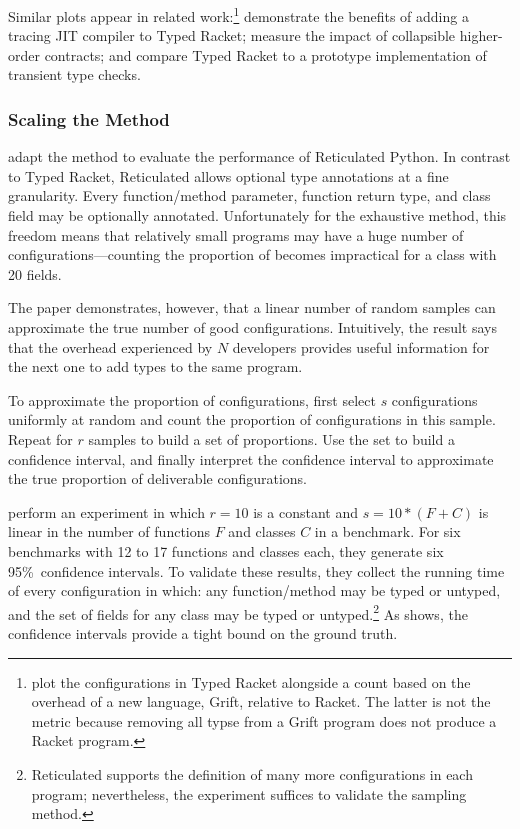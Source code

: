 Similar plots appear in related work:\footnote{\citet{kat-pldi-2019} plot the
  configurations in Typed Racket alongside a count based on
 the overhead of a new language, Grift, relative to Racket.
 The latter is not the  metric because removing all typse from
 a Grift program does not produce a Racket program.}
\citet{bbst-oopsla-2017} demonstrate the benefits of adding a tracing JIT compiler to Typed Racket;
\citet{fgsfs-oopsla-2018} measure the impact of collapsible higher-order contracts; and
\citet{gf-icfp-2018} compare Typed Racket to a prototype implementation of transient type checks.


\subsubsection{Scaling the Method}

\citet{gm-pepm-2018} adapt the method to evaluate the performance of Reticulated
 Python.
In contrast to Typed Racket, Reticulated allows optional type annotations at
 a fine granularity.
Every function/method parameter, function return type, and class field may
 be optionally annotated.
Unfortunately for the exhaustive method, this freedom means that relatively
 small programs may have a huge number of configurations---counting
 the proportion of  becomes impractical for a class with 20 fields.

The paper demonstrates, however, that a linear number of random samples can
 approximate the true number of good configurations.
Intuitively, the result says that the overhead experienced by $N$ developers
 provides useful information for the next one to add types to the same program.

To approximate the proportion of  configurations,
 first select $s$ configurations uniformly at random and count the
 proportion of  configurations in this sample.
Repeat for $r$ samples to build a set of proportions.
Use the set to build a confidence interval, and finally interpret the
 confidence interval to approximate the true proportion of deliverable configurations.

\citet{gm-pepm-2018} perform an experiment in which $r=10$ is a constant
 and $s = 10 * (F + C)$ is linear in the number of functions $F$ and classes
 $C$ in a benchmark.
For six benchmarks with 12 to 17 functions and classes each,
 they generate six 95\%~confidence intervals.
To validate these results, they collect the running time of every configuration
 in which: any function/method may be typed or untyped, and the set of fields
 for any class may be typed or untyped.\footnote{Reticulated supports the definition
  of many more configurations in each program; nevertheless, the experiment suffices to
  validate the sampling method.}
As  shows, the confidence intervals provide a tight
 bound on the ground truth.

